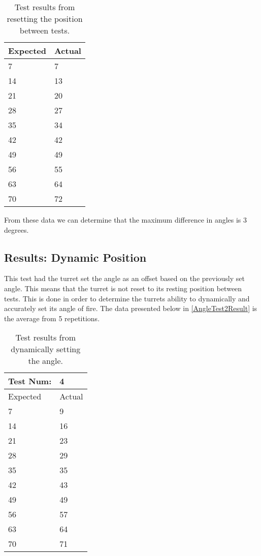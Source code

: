 \begin{table}[H]
\centering
\begin{tabular}{ll}
\multicolumn{1}{l|}{Expected} & Actual \\ \hline
\multicolumn{1}{l|}{7}        & 7     \\
\multicolumn{1}{l|}{14}       & 13     \\
\multicolumn{1}{l|}{21}       & 20     \\
\multicolumn{1}{l|}{28}       & 27     \\
\multicolumn{1}{l|}{35}       & 34     \\
\multicolumn{1}{l|}{42}       & 42     \\
\multicolumn{1}{l|}{49}       & 49     \\
\multicolumn{1}{l|}{56}       & 55     \\
\multicolumn{1}{l|}{63}       & 64     \\
\multicolumn{1}{l|}{70}       & 72
\end{tabular}
\caption{Test results from resetting the position between tests.}
\label{AngleTest1Result}
\end{table}

From these data we can determine that the maximum difference in angles is 3
degrees.  

\subsection{Results: Dynamic Position}
This test had the turret set the angle as an offset based on the previously set
angle. This means that the turret is not reset to its resting position between
tests. This is done in order to determine the turrets ability to dynamically and
accurately set its angle of fire. The data presented below in
\autoref{AngleTest2Result} is the average from 5 repetitions.

\begin{table}[H]
\centering
\begin{tabular}{ll}
Test Num:                     & 4      \\ \hline
\multicolumn{1}{l|}{Expected} & Actual \\ \hline
\multicolumn{1}{l|}{7}        & 9     \\
\multicolumn{1}{l|}{14}       & 16     \\
\multicolumn{1}{l|}{21}       & 23     \\
\multicolumn{1}{l|}{28}       & 29     \\
\multicolumn{1}{l|}{35}       & 35     \\
\multicolumn{1}{l|}{42}       & 43     \\
\multicolumn{1}{l|}{49}       & 49     \\
\multicolumn{1}{l|}{56}       & 57     \\
\multicolumn{1}{l|}{63}       & 64     \\
\multicolumn{1}{l|}{70}       & 71
\end{tabular}
\caption{Test results from dynamically setting the angle.}
\label{AngleTest1Result}
\end{table}

